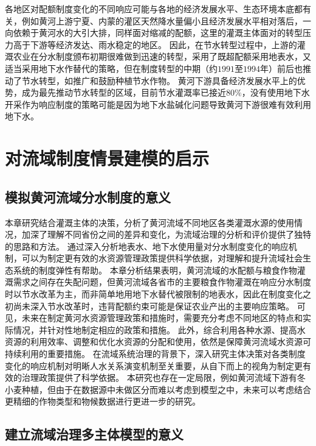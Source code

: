 各地区对配额制度变化的不同响应可能与各地的经济发展水平、生态环境本底都有关，例如黄河上游宁夏、内蒙的灌区天然降水量偏小且经济发展水平相对落后，一向依赖于黄河水的大引大排，同样面对缩减的配额，这里的灌溉主体面对的转型压力高于下游等经济发达、雨水稳定的地区\cite{xiong2021a}。
因此，在节水转型过程中，上游的灌溉农业在分水制度颁布初期很难做到迅速的转型，采用了既超配额采用地表水，又适当采用地下水作替代的策略，但在制度转型的中期（约$1991$至$1994$年）前后也推动了节水转型，如推广和鼓励种植节水作物\cite{yin2021}。
黄河下游具备经济发展水平上的优势，成为最先推动节水转型的区域，目前节水灌溉率已接近$80\%$，没有使用地下水开采作为响应制度的策略可能是因为地下水盐碱化问题导致黄河下游很难有效利用地下水\cite{huangronghan1962, fu2021}。

\section{对流域制度情景建模的启示}

\subsection{模拟黄河流域分水制度的意义}

本章研究结合灌溉主体的决策，分析了黄河流域不同地区各类灌溉水源的使用情况，加深了理解不同省份之间的差异和变化，为流域治理的分析和评价提供了独特的思路和方法。
通过深入分析地表水、地下水使用量对分水制度变化的响应机制，可以为制定更有效的水资源管理政策提供科学依据，对理解和提升流域社会\textendash{}生态系统的制度弹性有帮助。
本章分析结果表明，黄河流域的水配额与粮食作物灌溉需求之间存在失配问题，但黄河流域各省市的主要粮食作物灌溉在响应分水制度时以节水改革为主，而非简单地用地下水替代被限制的地表水，因此在制度变化之初尚未深入节水改革时，违背配额约束可能是保证农业产出的主要响应策略。
可见，未来在制定黄河水资源管理政策和措施时，需要充分考虑不同地区的特点和实际情况，并针对性地制定相应的政策和措施。
此外，综合利用各种水源、提高水资源的利用效率、调整和优化水资源的分配和使用，依然是保障黄河流域水资源可持续利用的重要措施。
在流域系统治理的背景下，深入研究主体决策对各类制度变化的响应机制对明晰人\textendash{}水关系演变机制至关重要，从自下而上的视角为制定更有效的治理政策提供了科学依据。
本研究也存在一定局限，例如黄河流域下游有冬小麦种植，但由于在数据源中未做区分而难以考虑到模型之中，未来可以考虑结合更精细的作物类型和物候数据进行更进一步的研究。

\subsection{建立流域治理多主体模型的意义}


